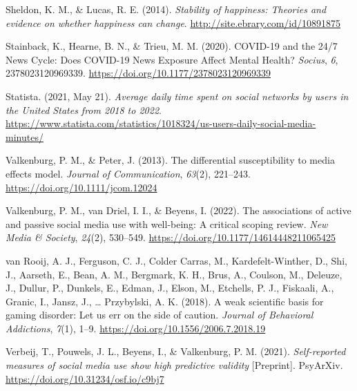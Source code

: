 \documentclass[
  man,mask]{apa7}
\newlength{\cslhangindent}
\newlength{\cslentryspacingunit} %
\newenvironment{CSLReferences}[2] %
 {%
  \setlength{\parindent}{0pt}
  \ifodd #1
  \let\oldpar\par
  \def\par{\hangindent=\cslhangindent\oldpar}
  \fi
  \setlength{\parskip}{#2\cslentryspacingunit}
 }%
 {}
\begin{document}
\begin{CSLReferences}{1}{0}
\leavevmode{}%
Sheldon, K. M., \& Lucas, R. E. (2014). \emph{Stability of happiness: Theories and evidence on whether happiness can change}. \url{http://site.ebrary.com/id/10891875}

\leavevmode{}%
Stainback, K., Hearne, B. N., \& Trieu, M. M. (2020). {COVID-19} and the 24/7 {News Cycle}: {Does COVID-19 News Exposure Affect Mental Health}? \emph{Socius}, \emph{6}, 2378023120969339. \url{https://doi.org/10.1177/2378023120969339}

\leavevmode{}%
Statista. (2021, May 21). \emph{Average daily time spent on social networks by users in the {United States} from 2018 to 2022}. \url{https://www.statista.com/statistics/1018324/us-users-daily-social-media-minutes/}

\leavevmode{}%
Valkenburg, P. M., \& Peter, J. (2013). The differential susceptibility to media effects model. \emph{Journal of Communication}, \emph{63}(2), 221--243. \url{https://doi.org/10.1111/jcom.12024}

\leavevmode{}%
Valkenburg, P. M., van Driel, I. I., \& Beyens, I. (2022). The associations of active and passive social media use with well-being: {A} critical scoping review. \emph{New Media \& Society}, \emph{24}(2), 530--549. \url{https://doi.org/10.1177/14614448211065425}

\leavevmode{}%
van Rooij, A. J., Ferguson, C. J., Colder Carras, M., Kardefelt-Winther, D., Shi, J., Aarseth, E., Bean, A. M., Bergmark, K. H., Brus, A., Coulson, M., Deleuze, J., Dullur, P., Dunkels, E., Edman, J., Elson, M., Etchells, P. J., Fiskaali, A., Granic, I., Jansz, J., \ldots{} Przybylski, A. K. (2018). A weak scientific basis for gaming disorder: {Let} us err on the side of caution. \emph{Journal of Behavioral Addictions}, \emph{7}(1), 1--9. \url{https://doi.org/10.1556/2006.7.2018.19}

\leavevmode{}%
Verbeij, T., Pouwels, J. L., Beyens, I., \& Valkenburg, P. M. (2021). \emph{Self-reported measures of social media use show high predictive validity} {[}Preprint{]}. {PsyArXiv}. \url{https://doi.org/10.31234/osf.io/c9bj7}


\end{CSLReferences}
\end{document}
